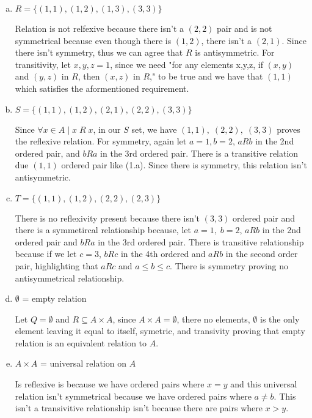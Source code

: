 \documentclass[11pt, a4paper]{article}
\begin{document}
        \begin{enumerate}[(a)]
			\item $R = \{(1, 1), (1, 2), (1, 3), (3, 3)\}$

                Relation is not relfexive because there isn't a $(2,2)$ pair and is not symmetrical because even though there is $(1,2)$, there isn't a $(2,1)$. Since there isn't symmetry, thus we can agree that $R$ is antisymmetric. For transitivity, let $x,y,z = 1$, since we need "for any elements x,y,z, if $(x,y)$ and $(y,z)$ in $R$, then $(x,z)$ in $R$," to be true and we have that $(1,1)$ which satisfies the aformentioned requirement.    

			\item $S = \{(1, 1), (1, 2), (2, 1), (2, 2), (3, 3)\}$

                Since $\forall x\in A\;|\;x\;R\;x$, in our $S$ set, we have $(1,1),\;(2,2),\;(3,3)$ proves the reflexive relation. For symmetry, again let $a = 1, b = 2$, $aRb$ in the 2nd ordered pair, and $bRa$ in the 3rd ordered pair. There is a transitive relation due $(1,1)$ ordered pair like (1.a). Since there is symmetry, this relation isn't antisymmetric. 

			\item $T = \{(1, 1), (1, 2), (2, 2), (2, 3)\}$

                There is no reflexivity present because there isn't $(3,3)$ ordered pair and there is a symmetircal relationship because, let $a = 1,\;b=2$, $aRb$ in the 2nd ordered pair and $bRa$ in the 3rd ordered pair. There is transitive relationship because if we let $c = 3$, $bRc$ in the 4th ordered and $aRb$ in the second order pair, highlighting that $aRc$ and $a\leq b \leq c$. There is symmetry proving no antisymmetrical relationship.

			\item $\emptyset$ = empty relation

            Let $Q = \emptyset$ and $R\subseteq A \times A$, since $A\times A =\emptyset$, there no elements, $\emptyset$ is the only element leaving it equal to itself, symetric, and transivity proving that empty relation is an equivalent relation to $A$.

			\item $A \times A$ = universal relation on $A$

            Is reflexive is because we have ordered pairs where $x=y$ and this universal relation isn't symmetrical because we have ordered pairs where $a\neq b$. This isn't a transivitive relationship isn't because there are pairs where $x>y$. 

        \end{enumerate}
\end{document}
